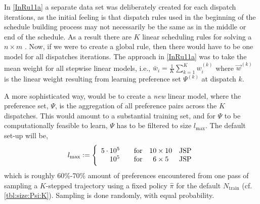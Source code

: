 In \cref{InRu11a} a separate data set was deliberately created for each 
dispatch iterations, as the initial feeling is that dispatch rules used in the 
beginning of the schedule building process may not necessarily be the same as 
in the middle or end of the schedule. As a result there are $K$ linear 
scheduling rules for solving a $n \times m$ \jsp. 
Now, if we were to create a global rule, then there would have to be one 
model for all dispatches iterations. The approach in \cref{InRu11a} was to take 
the mean weight for all stepwise linear models, i.e., 
$\bar{w}_i=\frac{1}{K}\sum_{k=1}^K w_i^{(k)}$ where $\vec{w}^{(k)}$ is 
the linear weight resulting from learning preference set $\Psi^{(k)}$ at 
dispatch $k$. 

A more sophisticated way, would be to create a \emph{new} linear model, where 
the preference set, $\Psi$, is the aggregation  of all preference pairs across 
the $K$ dispatches. 
This would amount to a substantial training set, and for $\Psi$ to 
be computationally feasible to learn, $\Psi$ has to be filtered to size 
$l_{\max}$. The default set-up will be, 
\begin{equation}\label{eq:lmax}
l_{\max} := \Bigg \{ \begin{array}{rccc} 
5 \cdot 10^5 & \quad\text{for} & 10\times 10 & \text{\JSP} \\
10^5 & \quad\text{for} & 6\times 5 & \text{\JSP}
\end{array}
\end{equation}
which is roughly 60\%-70\% amount of preferences encountered from one pass of 
sampling a \mbox{$K$-stepped} trajectory using a fixed policy $\hat{\pi}$ for 
the default $N_{\text{train}}$ (cf. \cref{tbl:size:Psi:K}). 
Sampling is done randomly, with equal probability.

